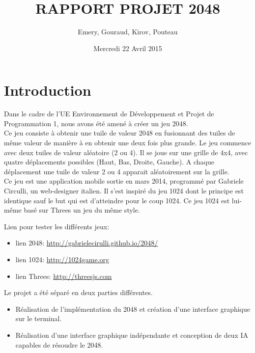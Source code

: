 \documentclass[a4paper]{article}
\author{Emery, Gouraud, Kirov, Pouteau}
\date{Mercredi 22 Avril 2015}
\title{\textbf{RAPPORT PROJET 2048}}
\begin{document}
 \maketitle
 \tableofcontents

 \newpage
 \section{Introduction}
 \label{sec-1}

 Dans le cadre de l'UE Environnement de Développement et Projet de
 Programmation 1, nous avons été amené à créer un jeu 2048.\\
 Ce jeu consiste à obtenir une tuile de valeur 2048 en fusionnant des
 tuiles de même valeur de manière à en obtenir une deux fois plus
 grande. Le jeu commence avec deux tuiles de valeur aléatoire (2 ou 4). Il se joue
 sur une grille de 4x4, avec quatre déplacements possibles (Haut, Bas, Droite, Gauche). 
 A chaque déplacement une tuile de valeur 2 ou 4 apparait aléatoirement sur la grille.\\
 Ce jeu est une application mobile sortie en mars 2014, programmé par
 Gabriele Circulli, un web-designer italien. Il s'est inspiré du jeu
 1024 dont le principe est identique sauf le but qui est
 d'atteindre pour le coup 1024. Ce jeu 1024 est lui-même basé sur Threes un jeu du
 même style.

 \noindent
 Lien pour tester les différents jeux: 

 \begin{itemize}
 \item lien 2048: \url{http://gabrielecirulli.github.io/2048/}

 \item lien 1024: \url{http://1024game.org}

 \item lien Threes: \url{http://threesjs.com}
 \end{itemize}

 \vspace{1cm}
 \noindent
 Le projet a été séparé en deux parties différentes.
 \begin{itemize}
 \item Réalisation de l'implémentation du 2048 et création d'une interface
 graphique sur le terminal.
 \item Réalisation d'une interface graphique indépendante et conception de
 deux IA capables de résoudre le 2048.
 \end{itemize}


 \newpage
\end{document}
